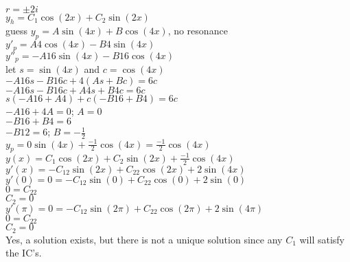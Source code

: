 \documentclass{article}
\begin{document}
\begin{enumerate}
\\$r=\pm2i$
\\$y_h=C_1\cos(2x)+C_2\sin(2x)$
\\guess $y_p=A\sin(4x)+B\cos(4x)$, no resonance
\\$y'_p=A4\cos(4x)-B4\sin(4x)$
\\$y''_p=-A16\sin(4x)-B16\cos(4x)$
\\let $s=\sin(4x)$ and $c=\cos(4x)$
\\$-A16s-B16c+4(As+Bc)=6c$
\\$-A16s-B16c+A4s+B4c=6c$
\\$s(-A16+A4)+c(-B16+B4)=6c$
\\$-A16+4A=0$; $A=0$
\\$-B16+B4=6$
\\$-B12=6$; $B=-\frac{1}{2}$
\\$y_p=0\sin(4x)+\frac{-1}{2}\cos(4x)=\frac{-1}{2}\cos(4x)$
\\$y(x)=C_1\cos(2x)+C_2\sin(2x)+\frac{-1}{2}\cos(4x)$
\\$y'(x)=-C_12\sin(2x)+C_22\cos(2x)+2\sin(4x)$
\\$y'(0)=0=-C_12\sin(0)+C_22\cos(0)+2\sin(0)$
\\$0=C_22$
\\$C_2=0$
\\$y'(\pi)=0=-C_12\sin(2\pi)+C_22\cos(2\pi)+2\sin(4\pi)$
\\$0=C_22$
\\$C_2=0$
\\Yes, a solution exists, but there is not a unique solution since any $C_1$ will satisfy the IC's.


\end{enumerate}
\end{document}

